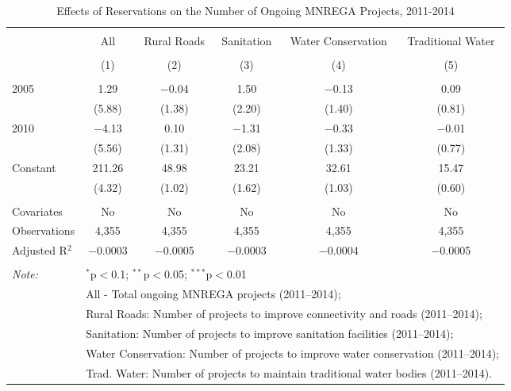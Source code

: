 
\begin{table}[!htbp] \centering 
  \caption{Effects of Reservations on the Number of Ongoing MNREGA Projects, 2011-2014} 
  \label{main_mnrega_ongoing} 
\scriptsize 
\begin{tabular}{@{\extracolsep{0pt}}lccccc} 
\\[-1.8ex]\hline 
\hline \\[-1.8ex] 
 & All & Rural Roads & Sanitation & Water Conservation & Traditional Water \\ 
\\[-1.8ex] & (1) & (2) & (3) & (4) & (5)\\ 
\hline \\[-1.8ex] 
 2005 & 1.29 & $-$0.04 & 1.50 & $-$0.13 & 0.09 \\ 
  & (5.88) & (1.38) & (2.20) & (1.40) & (0.81) \\ 
  2010 & $-$4.13 & 0.10 & $-$1.31 & $-$0.33 & $-$0.01 \\ 
  & (5.56) & (1.31) & (2.08) & (1.33) & (0.77) \\ 
  Constant & 211.26 & 48.98 & 23.21 & 32.61 & 15.47 \\ 
  & (4.32) & (1.02) & (1.62) & (1.03) & (0.60) \\ 
 \hline \\[-1.8ex] 
Covariates & No & No & No & No & No \\ 
Observations & 4,355 & 4,355 & 4,355 & 4,355 & 4,355 \\ 
Adjusted R$^{2}$ & $-$0.0003 & $-$0.0005 & $-$0.0003 & $-$0.0004 & $-$0.0005 \\ 
\hline 
\hline \\[-1.8ex] 
\textit{Note:}  & \multicolumn{5}{l}{$^{*}$p$<$0.1; $^{**}$p$<$0.05; $^{***}$p$<$0.01} \\ 
 & \multicolumn{5}{l}{All - Total ongoing MNREGA projects (2011--2014);} \\ 
 & \multicolumn{5}{l}{Rural Roads: Number of projects to improve connectivity and roads (2011--2014);} \\ 
 & \multicolumn{5}{l}{Sanitation:  Number of projects to improve sanitation facilities  (2011--2014);} \\ 
 & \multicolumn{5}{l}{Water Conservation: Number of projects to improve water conservation (2011--2014);} \\ 
 & \multicolumn{5}{l}{Trad. Water: Number of projects to maintain traditional water bodies (2011--2014).} \\ 
\end{tabular} 
\end{table} 
